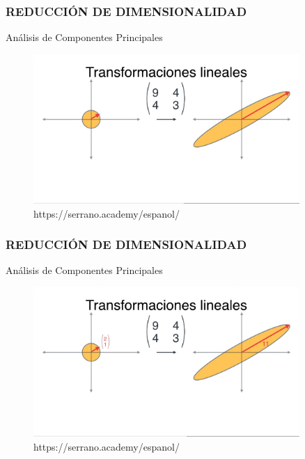 \documentclass{beamer}
\begin{document}
\begin{frame}
	\frametitle{REDUCCIÓN DE DIMENSIONALIDAD}
	\begin{block}{Análisis de Componentes Principales}	
		\begin{figure}
			\includegraphics[width=0.9\textwidth]{PCA/IMG_3571.jpg}
			\caption{https://serrano.academy/espanol/}
		\end{figure}
	\end{block}
\end{frame}

\begin{frame}
	\frametitle{REDUCCIÓN DE DIMENSIONALIDAD}
	\begin{block}{Análisis de Componentes Principales}	
		\begin{figure}
			\includegraphics[width=0.9\textwidth]{PCA/IMG_3572.jpg}
			\caption{https://serrano.academy/espanol/}
		\end{figure}
	\end{block}
\end{frame}
\end{document}
